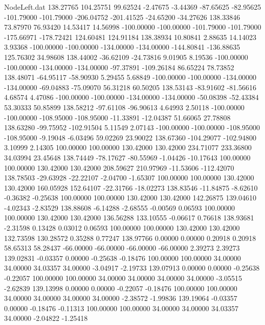 \begin{filecontents}{NodeLeft.dat}
 138.27765  104.25751   99.62524    -2.47675   -3.44369  -87.65625  -82.95625 -101.79000 -101.79000 -206.04752 -201.41525  -24.65200  -34.27626
 138.33846   73.87970   76.93420    14.53417   14.56998 -100.00000 -100.00000 -101.79000 -101.79000 -175.66971 -178.72421  124.60481  124.91184
 138.38934   10.80841    2.88635    14.14023    3.93368 -100.00000 -100.00000 -134.00000 -134.00000 -144.80841 -136.88635  125.76302   34.98608
 138.44002  -36.62109  -24.73816     9.01905    8.19536 -100.00000 -100.00000 -134.00000 -134.00000  -97.37891 -109.26184   86.65224   78.73852
 138.48071  -64.95117  -58.90930     5.29455    5.68849 -100.00000 -100.00000 -134.00000 -134.00000  -69.04883  -75.09070   56.31218   60.50205
 138.53143  -83.91602  -81.56616     4.68574    4.47086 -100.00000 -100.00000 -134.00000 -134.00000  -50.08398  -52.43384   53.30333   50.85899
 138.58212  -97.61108  -96.90613     4.64993    2.50118 -100.00000 -100.00000 -108.95000 -108.95000  -11.33891  -12.04387   51.66065   27.78808
 138.63280  -99.75952 -102.91504     5.11549    2.07143 -100.00000 -100.00000 -108.95000 -108.95000   -9.19048   -6.03496   59.02269   23.90022
 138.67360 -104.29077 -102.94800     3.10999    2.14305  100.00000  100.00000  130.42000  130.42000  234.71077  233.36800   34.03994   23.45648
 138.74449  -78.17627  -80.55969    -1.04426  -10.17643  100.00000  100.00000  130.42000  130.42000  208.59627  210.97969  -11.53606 -112.42070
 138.78503  -29.63928  -22.22107    -2.04700   -1.65307  100.00000  100.00000  130.42000  130.42000  160.05928  152.64107  -22.31766  -18.02273
 138.83546  -11.84875   -8.62610    -0.36382   -0.25638  100.00000  100.00000  130.42000  130.42000  142.26875  139.04610   -4.02343   -2.83529
 138.88608   -6.14288   -2.68555    -0.00569    0.06593  100.00000  100.00000  130.42000  130.42000  136.56288  133.10555   -0.06617    0.76618
 138.93681   -2.31598    0.13428     0.03012    0.06593  100.00000  100.00000  130.42000  130.42000  132.73598  130.28572    0.35288    0.77247
 138.97766    0.00000    0.00000     0.20918    0.20918   58.65313   58.28437  -66.00000  -66.00000  -66.00000  -66.00000    2.39273    2.39273
 139.02831   -0.03357    0.00000    -0.25638   -0.18476  100.00000  100.00000   34.00000   34.00000   34.03357   34.00000   -3.04917   -2.19733
 139.07913    0.00000    0.00000    -0.25638   -0.22057  100.00000  100.00000   34.00000   34.00000   34.00000   34.00000   -3.05515   -2.62839
 139.13998    0.00000    0.00000    -0.22057   -0.18476  100.00000  100.00000   34.00000   34.00000   34.00000   34.00000   -2.38572   -1.99836
 139.19064   -0.03357    0.00000    -0.18476   -0.11313  100.00000  100.00000   34.00000   34.00000   34.03357   34.00000   -2.04822   -1.25418

\end{filecontents}
